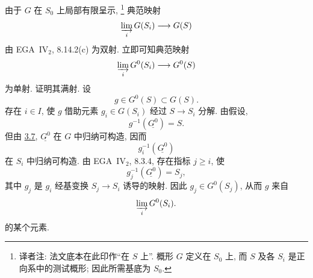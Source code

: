 由于 \(G\) 在 \(S_0\) 上局部有限呈示,%
\begingroup
\renewcommand{\thefootnote}{\fnsymbol{footnote}}%
\footnote[1]{\label{note:sga3-VIB-3.8-base}译者注:
法文底本在此印作``在 \(S\) 上''.
概形 \(G\) 定义在 \(S_0\) 上, 而 \(S\) 及各 \(S_i\)
是正向系中的测试概形; 因此所需基底为 \(S_0\).}%
\endgroup{}
典范映射
\[
  \varinjlim_i G(S_i)\longrightarrow G(S)
\]
由 EGA~IV\(_2\), 8.14.2(c) 为双射.
立即可知典范映射
\[
  \varinjlim_i G^0(S_i)\longrightarrow G^0(S)
\]
为单射. 证明其满射. 设
\[
  g\in G^0(S)\subset G(S).
\]
存在 \(i\in I\), 使 \(g\) 借助元素 \(g_i\in G(S_i)\)
经过 \(S\to S_i\) 分解. 由假设,
\[
  g^{-1}(\underline{G^0})=S.
\]
但由 \hyperref[prop:sga3-VIB-3.7]{3.7},
\(\underline{G^0}\) 在 \(G\) 中归纳可构造, 因而
\[
  g_i^{-1}(\underline{G^0})
\]
在 \(S_i\) 中归纳可构造.
由 EGA~IV\(_2\), 8.3.4, 存在指标 \(j\geq i\), 使
\[
  g_j^{-1}(\underline{G^0})=S_j,
\]
其中 \(g_j\) 是 \(g_i\) 经基变换 \(S_j\to S_i\) 诱导的映射.
因此 \(g_j\in G^0(S_j)\), 从而 \(g\) 来自
\[
  \varinjlim_i G^0(S_i).
\]
的某个元素.
